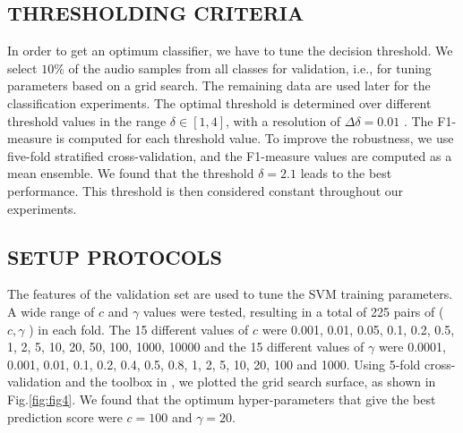 \documentclass{ieeeaccess}
\begin{document}
\subsection{THRESHOLDING CRITERIA}
In order to get an optimum classifier, we have to tune the decision threshold. We select $ 10\% $ of the audio samples from all classes for validation, i.e., for tuning parameters based on a grid search. The remaining data are used later for the classification experiments. The optimal threshold is determined over different threshold values in the range $\delta  \in [1,4]$, with a resolution of
$\Delta \delta  = 0.01$ . The F1-measure is computed for each threshold value. To improve the  robustness, we use five-fold stratified cross-validation, and the F1-measure values are computed as a mean ensemble. We found that the threshold $ \delta  = 2.1 $ leads to the best performance. This threshold is then considered constant throughout our experiments.

\subsection{SETUP PROTOCOLS}
The features of the validation set are used to tune the SVM training parameters. A wide range of  $ c $ and $ \gamma $ values were tested, resulting in a total of 225 pairs of ( $ c,\gamma $ ) in each fold. The 15 different values of   $c$  were 0.001, 0.01, 0.05, 0.1, 0.2, 0.5, 1, 2, 5, 10, 20, 50, 100, 1000, 10000 and the 15 different values of $ \gamma $  were 0.0001, 0.001, 0.01, 0.1, 0.2, 0.4, 0.5, 0.8, 1, 2, 5, 10, 20, 100 and 1000. Using 5-fold cross-validation and the toolbox in \cite{37}, we plotted the grid search surface, as shown in Fig.\ref{fig:fig4}. We found that the optimum hyper-parameters that give the best prediction score were  $c=100$ and $ \gamma=20 $.
\end{document}
